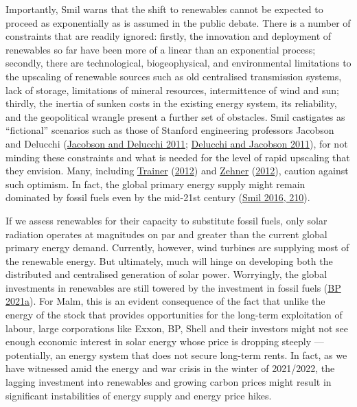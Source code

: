 \documentclass[a4paper, nobind]{templates/ociamthesis}
\begin{document}
Importantly, Smil warns that the shift to renewables cannot be expected to proceed as exponentially as is assumed in the public debate. There is a number of constraints that are readily ignored: firstly, the innovation and deployment of renewables so far have been more of a linear than an exponential process; secondly, there are technological, biogeophysical, and environmental limitations to the upscaling of renewable sources such as old centralised transmission systems, lack of storage, limitations of mineral resources, intermittence of wind and sun; thirdly, the inertia of sunken costs in the existing energy system, its reliability, and the geopolitical wrangle present a further set of obstacles. Smil castigates as ``fictional'' scenarios such as those of Stanford engineering professors Jacobson and Delucchi (\protect\hyperlink{ref-jacobson_providing_2011}{Jacobson and Delucchi 2011}; \protect\hyperlink{ref-delucchi_providing_2011}{Delucchi and Jacobson 2011}), for not minding these constraints and what is needed for the level of rapid upscaling that they envision. Many, including \protect\hyperlink{ref-trainer_critique_2012}{Trainer} (\protect\hyperlink{ref-trainer_critique_2012}{2012}) and \protect\hyperlink{ref-zehner_green_2012}{Zehner} (\protect\hyperlink{ref-zehner_green_2012}{2012}), caution against such optimism. In fact, the global primary energy supply might remain dominated by fossil fuels even by the mid-21st century (\protect\hyperlink{ref-smil_energy_2016}{Smil 2016, 210}).

If we assess renewables for their capacity to substitute fossil fuels, only solar radiation operates at magnitudes on par and greater than the current global primary energy demand. Currently, however, wind turbines are supplying most of the renewable energy. But ultimately, much will hinge on developing both the distributed and centralised generation of solar power. Worryingly, the global investments in renewables are still towered by the investment in fossil fuels (\protect\hyperlink{ref-bp_energy_2021}{BP 2021a}). For Malm, this is an evident consequence of the fact that unlike the energy of the stock that provides opportunities for the long-term exploitation of labour, large corporations like Exxon, BP, Shell and their investors might not see enough economic interest in solar energy whose price is dropping steeply --- potentially, an energy system that does not secure long-term rents. In fact, as we have witnessed amid the energy and war crisis in the winter of 2021/2022, the lagging investment into renewables and growing carbon prices might result in significant instabilities of energy supply and energy price hikes.
\end{document}

